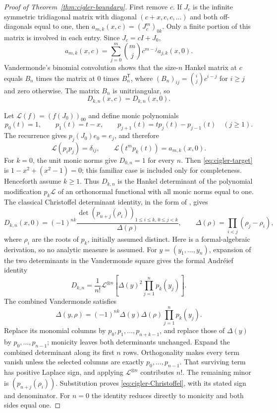 \documentclass[11pt,a4paper]{article}
\theoremstyle{definition}\newtheorem{definition}[theorem]{Definition}
\theoremstyle{remark}\newtheorem{remark}[theorem]{Remark}
\begin{document}
\begin{proof}[Proof of Theorem~\ref{thm:cigler-boundary}]
First remove $c$. If $J_c$ is the infinite symmetric tridiagonal matrix
with diagonal $(c+x,c,c,\ldots)$ and both off-diagonals equal to one,
then $a_{m,k}(x,c)=(J_c^m)_{0k}$. Only a finite portion of this matrix
is involved in each entry. Since $J_c=cI+J_0$,
\[
 a_{m,k}(x,c)=\sum_{j=0}^{m}\binom mj c^{m-j}a_{j,k}(x,0).
\]
Vandermonde's binomial convolution shows that the size-$n$ Hankel matrix
at $c$ equals $B_n$ times the matrix at $0$ times $B_n^{\mathsf T}$,
where $(B_n)_{ij}=\binom ij c^{i-j}$ for $i\geq j$ and zero otherwise.
The matrix $B_n$ is unitriangular, so
\begin{equation}\label{eq:cigler-c-independence}
 D_{k,n}(x,c)=D_{k,n}(x,0).
\end{equation}

Let $\mathcal L(f)=(f(J_0))_{00}$ and define monic polynomials
\[
 p_0(t)=1,\qquad p_1(t)=t-x,\qquad
 p_{j+1}(t)=t p_j(t)-p_{j-1}(t)\quad(j\geq1).
\]
The recurrence gives $p_j(J_0)e_0=e_j$, and therefore
\[
 \mathcal L(p_i p_j)=\delta_{ij},\qquad
 \mathcal L(t^m p_k(t))=a_{m,k}(x,0).
\]
For $k=0$, the unit monic norms give $D_{0,n}=1$ for every $n$.
Then \eqref{eq:cigler-target} is $1-x^2+(x^2-1)=0$; this familiar
case is included only for completeness. Henceforth assume $k\geq1$.
Thus $D_{k,n}$ is the Hankel determinant of the polynomial modification
$p_k\mathcal L$ of an orthonormal functional with all monic norms equal
to one. The classical Christoffel determinant identity, in the form of
\cite[Theorem~1]{Krattenthaler23}, gives
\begin{equation}\label{eq:cigler-Christoffel}
 D_{k,n}(x,0)
    =(-1)^{nk}\frac{\det(p_{n+j}(\rho_i))_{1\leq i\leq k,\,0\leq j<k}}
                        {\Delta(\rho)},
 \qquad \Delta(\rho)=\prod_{i<j}(\rho_j-\rho_i),
\end{equation}
where $\rho_i$ are the roots of $p_k$, initially assumed distinct.
Here is a formal-algebraic derivation, so no analytic measure is
assumed. For $y=(y_1,\ldots,y_n)$, expansion of the two determinants
in the Vandermonde square gives the formal Andr\'eief identity
\[
 D_{k,n}=\frac1{n!}\mathcal L^{\otimes n}
       \left[\Delta(y)^2\prod_{j=1}^n p_k(y_j)\right].
\]
The combined Vandermonde satisfies
\[
 \Delta(y,\rho)=(-1)^{nk}\Delta(y)\Delta(\rho)
                         \prod_{j=1}^n p_k(y_j).
\]
Replace its monomial columns by $p_0,p_1,\ldots,p_{n+k-1}$, and
replace those of $\Delta(y)$ by $p_0,\ldots,p_{n-1}$; monicity leaves
both determinants unchanged. Expand the combined determinant along its
first $n$ rows. Orthogonality makes every term vanish unless the selected
columns are exactly $p_0,\ldots,p_{n-1}$. That surviving term has positive
Laplace sign, and applying $\mathcal L^{\otimes n}$ contributes $n!$.
The remaining minor is $(p_{n+j}(\rho_i))$. Substitution proves
\eqref{eq:cigler-Christoffel}, with its stated sign and denominator.
For $n=0$ the identity reduces directly to monicity and both sides equal one.


\end{proof}
\end{document}

